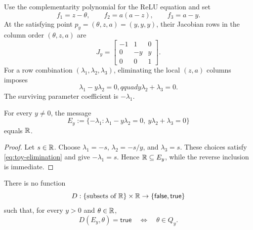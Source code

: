 Use the complementarity polynomial for the ReLU equation and set
\begin{equation}
  f_1=z-\theta,\qquad
  f_2=a(a-z),\qquad
  f_3=a-y.
\end{equation}
At the satisfying point \(p_y=(\theta,z,a)=(y,y,y)\), their Jacobian rows in
the column order \((\theta,z,a)\) are
\begin{equation}
  J_y=
  \begin{bmatrix}
    -1&1&0\\
    0&-y&y\\
    0&0&1
  \end{bmatrix}.
  \label{eq:toy-jacobian}
\end{equation}
For a row combination \((\lambda_1,\lambda_2,\lambda_3)\), eliminating the
local \((z,a)\) columns imposes
\begin{equation}
  \lambda_1-y\lambda_2=0,qquad
  y\lambda_2+\lambda_3=0.
  \label{eq:toy-elimination}
\end{equation}
The surviving parameter coefficient is \(-\lambda_1\).

\begin{theorem}
\label{thm:scalar-message-universal}
For every \(y\ne0\), the message
\begin{equation}
  E_y:=\{-\lambda_1:\lambda_1-y\lambda_2=0,
  \ y\lambda_2+\lambda_3=0\}
\end{equation}
equals \(\mathbb{R}\).
\end{theorem}

\begin{proof}
Let \(s\in\mathbb{R}\).  Choose
\(\lambda_1=-s\), \(\lambda_2=-s/y\), and \(\lambda_3=s\).  These choices
satisfy \cref{eq:toy-elimination} and give \(-\lambda_1=s\).  Hence
\(\mathbb{R}\subseteq E_y\), while the reverse inclusion is immediate.
\end{proof}

\begin{corollary}
\label{cor:no-message-decoder}
There is no function
\begin{equation}
  D:\{\text{subsets of }\mathbb{R}\}\times\mathbb{R}\to\{\mathsf{false},\mathsf{true}\}
\end{equation}
such that, for every \(y>0\) and \(\theta\in\mathbb{R}\),
\begin{equation}
  D(E_y,\theta)=\mathsf{true}
  \quad\Longleftrightarrow\quad \theta\in Q_y.
\end{equation}
\end{corollary}

